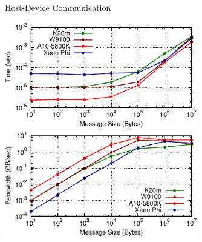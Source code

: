




\begin{frame}{Host-Device Communication}
 \begin{center}
  \includegraphics[width=0.63\textwidth]{figures/pcie-time-5-crop} \\
  \includegraphics[width=0.63\textwidth]{figures/pcie-bandwidth-5-crop}
 \end{center}
\end{frame}





